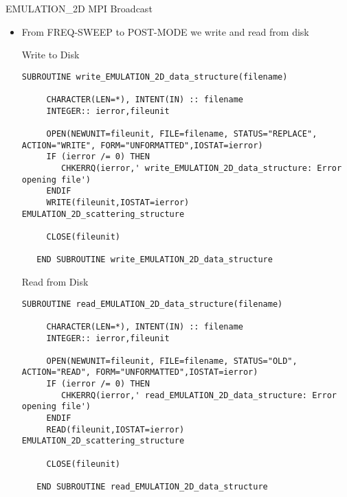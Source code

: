 %
%

\begin{frame}{EMULATION\_2D MPI Broadcast}

  \begin{itemize}
  \item From FREQ-SWEEP to POST-MODE we write and read from disk 
%
    \begin{block}{Write to Disk}
    \begin{lstlisting}[style=myFORTRANcodeS,basicstyle=\ttfamily\footnotesize]
   SUBROUTINE write_EMULATION_2D_data_structure(filename)
     
     CHARACTER(LEN=*), INTENT(IN) :: filename
     INTEGER:: ierror,fileunit
     
     OPEN(NEWUNIT=fileunit, FILE=filename, STATUS="REPLACE", ACTION="WRITE", FORM="UNFORMATTED",IOSTAT=ierror)
     IF (ierror /= 0) THEN
        CHKERRQ(ierror,' write_EMULATION_2D_data_structure: Error opening file')
     ENDIF
     WRITE(fileunit,IOSTAT=ierror)  EMULATION_2D_scattering_structure
     
     CLOSE(fileunit)
     
   END SUBROUTINE write_EMULATION_2D_data_structure
 \end{lstlisting}
\end{block}
 
   \framebreak %

   \begin{block}{Read from Disk}
   \begin{lstlisting}[style=myFORTRANcodeS,basicstyle=\ttfamily\footnotesize]
   SUBROUTINE read_EMULATION_2D_data_structure(filename)

     CHARACTER(LEN=*), INTENT(IN) :: filename
     INTEGER:: ierror,fileunit

     OPEN(NEWUNIT=fileunit, FILE=filename, STATUS="OLD", ACTION="READ", FORM="UNFORMATTED",IOSTAT=ierror)     
     IF (ierror /= 0) THEN
        CHKERRQ(ierror,' read_EMULATION_2D_data_structure: Error opening file')
     ENDIF
     READ(fileunit,IOSTAT=ierror)  EMULATION_2D_scattering_structure
     
     CLOSE(fileunit)

   END SUBROUTINE read_EMULATION_2D_data_structure
 \end{lstlisting}
\end{block}


\end{itemize}
\end{frame}

